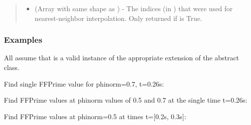 \documentclass[letterpaper,10pt,english]{sphinxmanual}
\begin{document}
\begin{fulllineitems}
\begin{fulllineitems}
\begin{quote}
\begin{description}
\begin{itemize}
\item {} 
 (Array with same shape as ) - The indices
(in ) that were used for
nearest-neighbor interpolation. Only returned if  is
True.

\end{itemize}


\end{description}\end{quote}
\subsubsection*{Examples}

All assume that  is a valid instance of the appropriate
extension of the {\hyperref[\detokenize{eqtools:eqtools.core.Equilibrium}]{}} abstract class.

Find single FFPrime value for phinorm=0.7, t=0.26s:

\begin{sphinxVerbatim}[commandchars=\\\{\}]
   
\end{sphinxVerbatim}

Find FFPrime values at phinorm values of 0.5 and 0.7 at the single time
t=0.26s:

\begin{sphinxVerbatim}[commandchars=\\\{\}]
  \PYG{p}{[} \PYG{p}{]} 
\end{sphinxVerbatim}

Find FFPrime values at phinorm=0.5 at times t={[}0.2s, 0.3s{]}:

\begin{sphinxVerbatim}[commandchars=\\\{\}]
   \PYG{p}{[} \PYG{p}{]}
\end{sphinxVerbatim}


\end{fulllineitems}
\end{fulllineitems}
\end{document}
